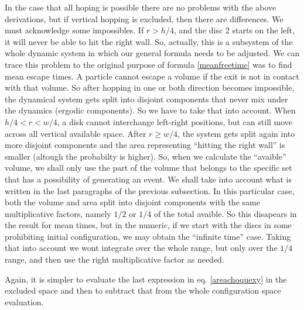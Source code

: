 \documentclass[letterpaper,10pt, jcp, aps]{revtex4-1}
\begin{document}
    
    In the case that all hoping is possible there are no problems with the above derivations,
    but if vertical hopping is excluded, then there are differences.
    We must acknowledge some impossibles. If $r>h/4$, and the disc 2 starts
    on the left, it will never be able to hit the right wall. So, actually, this
    is a subsystem of the whole dynamic system in which our general formula needs
    to be adjusted. We can trace this problem to the original purpose of
    formula \ref{meanfreetime}
    was to find mean escape times. A particle cannot escape a volume if the exit is
    not in contact with that volume. So after hopping in one or both direction
    becomes impossible, the dynamical system gets split into disjoint components
    that never mix under the dynamics (ergodic components). So we have to take that
    into account. When $h/4<r<w/4$, a disk cannot interchange left-right positions,
    but can still move across all vertical available space.  After $r\geq w/4$,
    the system gets split again into more disjoint components and the
    area representing ``hitting the right wall'' is smaller (altough the probabilty is
    higher). So, when we calculate the ``avaible'' volume, we shall only use the
    part of the volume that belongs to the specific set that has a possibility of
    generating an event. We shall take into account what is written in the last
    paragraphs of the previous subsection. In this particular case, both the
    volume and area split into disjoint components with the same multiplicative
    factors, namely $1/2$ or $1/4$ of the total avaible. So this disapears in the
    result for mean times, but in the numeric, if we start with the discs in some
    prohibiting initial configuration, we may obtain the ``infinite time'' case.
    Taking that into account we wont integrate over the whole range, but only over
    the $1/4$ range, and then use the right multiplicative factor as needed.

    Again, it is simpler to evaluate the last expression in eq. \ref{areachoquexy}
    in the excluded space and then to subtract that from the whole configuration
    space evaluation.
\end{document}
